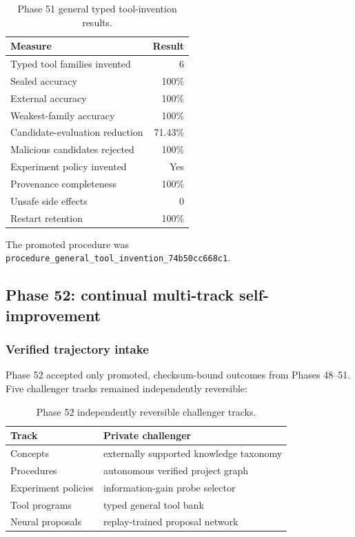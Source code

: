 \begin{table}[htbp]
\centering
\begin{tabular}{lr}
\hline
\textbf{Measure} & \textbf{Result}\\
\hline
Typed tool families invented & 6\\
Sealed accuracy & 100\%\\
External accuracy & 100\%\\
Weakest-family accuracy & 100\%\\
Candidate-evaluation reduction & 71.43\%\\
Malicious candidates rejected & 100\%\\
Experiment policy invented & Yes\\
Provenance completeness & 100\%\\
Unsafe side effects & 0\\
Restart retention & 100\%\\
\hline
\end{tabular}
\caption{Phase 51 general typed tool-invention results.}
\label{tab:phase51-results}
\end{table}

The promoted procedure was
\texttt{procedure\_general\_tool\_invention\_74b50cc668c1}.

\subsection{Phase 52: continual multi-track self-improvement}
\label{subsec:phase52-self-improvement}

\subsubsection{Verified trajectory intake}

Phase 52 accepted only promoted, checksum-bound outcomes from Phases
48--51.  Five challenger tracks remained independently reversible:
\begin{table}[htbp]
\centering
\begin{tabular}{ll}
\hline
\textbf{Track} & \textbf{Private challenger}\\
\hline
Concepts & externally supported knowledge taxonomy\\
Procedures & autonomous verified project graph\\
Experiment policies & information-gain probe selector\\
Tool programs & typed general tool bank\\
Neural proposals & replay-trained proposal network\\
\hline
\end{tabular}
\caption{Phase 52 independently reversible challenger tracks.}
\label{tab:phase52-tracks}
\end{table}


